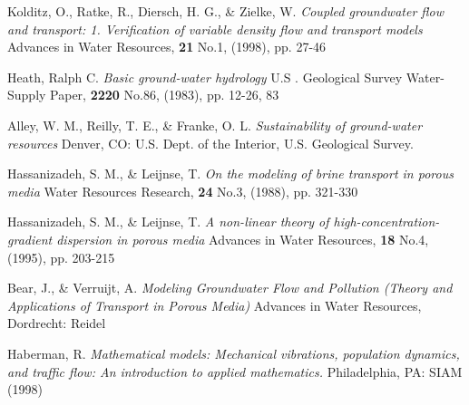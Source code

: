 \documentclass{article}
\begin{document}
\pagebreak


\begin{thebibliography}{99}

Kolditz, O., Ratke, R., Diersch, H. G., \& Zielke, W.
\textit{Coupled groundwater flow and transport: 1. Verification of variable density flow and transport models}
Advances in Water Resources, \textbf{21} No.1, (1998), pp. 27-46

Heath, Ralph C. 
\textit{Basic ground-water hydrology}
U.S . Geological Survey Water-Supply Paper, \textbf{2220} No.86, (1983), pp. 12-26, 83

Alley, W. M., Reilly, T. E., \& Franke, O. L. 
\textit{Sustainability of ground-water resources}
Denver, CO: U.S. Dept. of the Interior, U.S. Geological Survey.

Hassanizadeh, S. M., \& Leijnse, T. 
\textit{On the modeling of brine transport in porous media}
Water Resources Research, \textbf{24} No.3, (1988), pp. 321-330

Hassanizadeh, S. M., \& Leijnse, T. 
\textit{A non-linear theory of high-concentration-gradient dispersion in porous media}
Advances in Water Resources, \textbf{18} No.4, (1995), pp. 203-215

Bear, J., \& Verruijt, A.
\textit{Modeling Groundwater Flow and Pollution (Theory and Applications of Transport in Porous Media)}
Advances in Water Resources, Dordrecht: Reidel

Haberman, R.
\textit{Mathematical models: Mechanical vibrations, population dynamics, and traffic flow: An introduction to applied mathematics.}
Philadelphia, PA: SIAM (1998)

\end{thebibliography}
\end{document}
